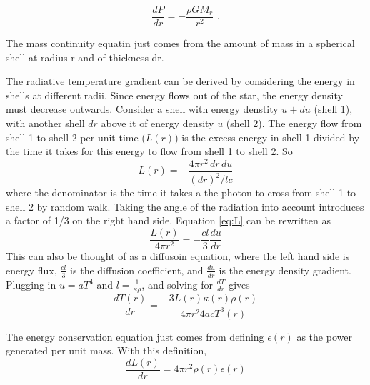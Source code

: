 \begin{equation}
\frac{dP}{dr} = -\frac{\rho G M_r}{r^2}\,\,.
\end{equation}

The mass continuity equatin just comes from the amount of mass in a spherical shell at radius r 
and of thickness dr.

The radiative temperature gradient can be derived by considering the energy in shells at different 
radii.  Since energy flows out of the star, the energy density must decrease outwards.  Consider 
a shell with energy denstity $u+du$ (shell 1), with another shell $dr$ above it of energy 
density $u$ (shell 2).  The energy flow from shell 1 to shell 2 per unit time ($L(r)$) is 
the excess energy in shell 1 divided by the time it takes for this energy to flow from shell 1 to 
shell 2.  So
\begin{equation}\label{eq:L}
L(r)=-\frac{4\pi r^2\,dr\,du}{(dr)^2/lc}
\end{equation}
where the denominator is the time it takes a the photon to cross from shell 1 to shell 2 by random 
walk.  Taking the angle of the radiation into account introduces a factor of 1/3 on the right hand 
side.  Equation \ref{eq:L} can be rewritten as 
\begin{equation}
\frac{L(r)}{4\pi r^2}=-\frac{cl}{3}\frac{du}{dr}
\end{equation}
This can also be thought of as a diffusoin equation, where the left hand side is energy flux, 
$\frac{cl}{3}$ is the diffusion coefficient, and $\frac{du}{dr}$ is the energy density gradient.  
Plugging in $u=aT^4$ and $l=\frac{1}{\kappa\rho}$, and solving for $\frac{dT}{dr}$ gives
\begin{equation}
\boxed{\frac{dT(r)}{dr}=-\frac{3L(r)\kappa(r)\rho(r)}{4\pi r^2 4acT^3(r)}}
\end{equation}

The energy conservation equation just comes from defining $\epsilon(r)$ as the power generated 
per unit mass.  With this definition,
\begin{equation}
\boxed{\frac{dL(r)}{dr}=4\pi r^2\rho (r)\epsilon (r)}
\end{equation}

